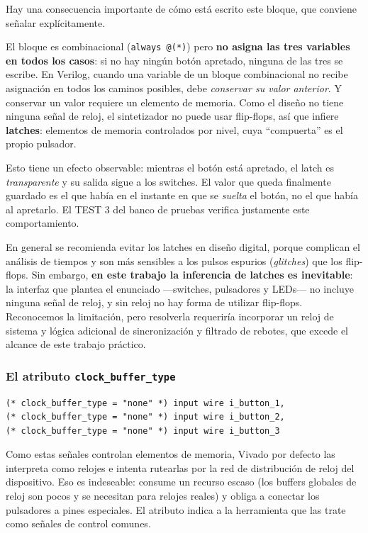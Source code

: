 \documentclass[12pt,a4paper]{article}
\begin{document}
Hay una consecuencia importante de cómo está escrito este bloque, que conviene
señalar explícitamente.

El bloque es combinacional (\texttt{always @(*)}) pero \textbf{no asigna las tres
variables en todos los casos}: si no hay ningún botón apretado, ninguna de las
tres se escribe. En Verilog, cuando una variable de un bloque combinacional no
recibe asignación en todos los caminos posibles, debe \emph{conservar su valor
anterior}. Y conservar un valor requiere un elemento de memoria. Como el diseño
no tiene ninguna señal de reloj, el sintetizador no puede usar flip-flops, así
que infiere \textbf{latches}: elementos de memoria controlados por nivel, cuya
``compuerta'' es el propio pulsador.

Esto tiene un efecto observable: mientras el botón está apretado, el latch es
\emph{transparente} y su salida sigue a los switches. El valor que queda
finalmente guardado es el que había en el instante en que se \emph{suelta} el
botón, no el que había al apretarlo. El TEST 3 del banco de pruebas verifica
justamente este comportamiento.

En general se recomienda evitar los latches en diseño digital, porque complican
el análisis de tiempos y son más sensibles a los pulsos espurios (\emph{glitches})
que los flip-flops. Sin embargo, \textbf{en este trabajo la inferencia de latches
es inevitable}: la interfaz que plantea el enunciado —switches, pulsadores y
LEDs— no incluye ninguna señal de reloj, y sin reloj no hay forma de utilizar
flip-flops. Reconocemos la limitación, pero resolverla requeriría incorporar un
reloj de sistema y lógica adicional de sincronización y filtrado de rebotes, que
excede el alcance de este trabajo práctico.

\subsubsection{El atributo \texttt{clock\_buffer\_type}}

\begin{lstlisting}[caption={Atributo aplicado a los pulsadores.}]
(* clock_buffer_type = "none" *) input wire i_button_1,
(* clock_buffer_type = "none" *) input wire i_button_2,
(* clock_buffer_type = "none" *) input wire i_button_3
\end{lstlisting}

Como estas señales controlan elementos de memoria, Vivado por defecto las
interpreta como relojes e intenta rutearlas por la red de distribución de reloj
del dispositivo. Eso es indeseable: consume un recurso escaso (los buffers
globales de reloj son pocos y se necesitan para relojes reales) y obliga a
conectar los pulsadores a pines especiales. El atributo indica a la herramienta
que las trate como señales de control comunes.
\end{document}
